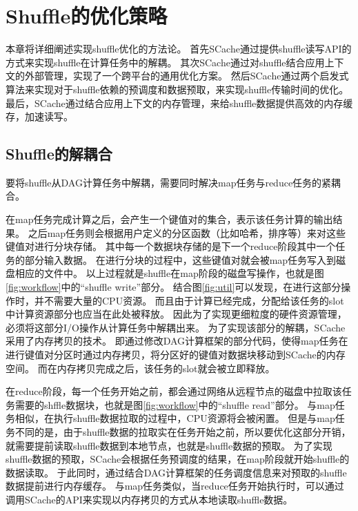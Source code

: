
\chapter{Shuffle的优化策略}
\label{chap:optimization}

本章将详细阐述实现shuffle优化的方法论。
首先SCache通过提供shuffle读写API的方式来实现shuffle在计算任务中的解耦。
其次SCache通过对shuffle结合应用上下文的外部管理，实现了一个跨平台的通用优化方案。
然后SCache通过两个启发式算法来实现对于shuffle依赖的预调度和数据预取，来实现shuffle传输时间的优化。
最后，SCache通过结合应用上下文的内存管理，来给shuffle数据提供高效的内存缓存，加速读写。

\section{Shuffle的解耦合}

要将shuffle从DAG计算任务中解耦，需要同时解决map任务与reduce任务的紧耦合。

在map任务完成计算之后，会产生一个键值对的集合，表示该任务计算的输出结果。
之后map任务则会根据用户定义的分区函数（比如哈希，排序等）来对这些键值对进行分块存储。
其中每一个数据块存储的是下一个reduce阶段其中一个任务的部分输入数据。
在进行分块的过程中，这些键值对就会被map任务写入到磁盘相应的文件中。
以上过程就是shuffle在map阶段的磁盘写操作，也就是图\ref{fig:workflow}中的“shuffle write”部分。
结合图\ref{fig:util}可以发现，在进行这部分操作时，并不需要大量的CPU资源。
而且由于计算已经完成，分配给该任务的slot中计算资源部分也应当在此处被释放。
因此为了实现更细粒度的硬件资源管理，必须将这部分I/O操作从计算任务中解耦出来。
为了实现该部分的解耦，SCache采用了内存拷贝的技术。
即通过修改DAG计算框架的部分代码，使得map任务在进行键值对分区时通过内存拷贝，将分区好的键值对数据块移动到SCache的内存空间。
而在内存拷贝完成之后，该任务的slot就会被立即释放。

在reduce阶段，每一个任务开始之前，都会通过网络从远程节点的磁盘中拉取该任务需要的shffle数据块，也就是图\ref{fig:workflow}中的“shuffle read”部分。
与map任务相似，在执行shuffle数据拉取的过程中，CPU资源将会被闲置。
但是与map任务不同的是，由于shuffle数据的拉取实在任务开始之前，所以要优化这部分开销，就需要提前读取shuffle数据到本地节点，也就是shuffle数据的预取。
为了实现shuffle数据的预取，SCache会根据任务预调度的结果，在map阶段就开始shuffle的数据读取。
于此同时，通过结合DAG计算框架的任务调度信息来对预取的shuffle数据提前进行内存缓存。
与map任务类似，当reduce任务开始执行时，可以通过调用SCache的API来实现以内存拷贝的方式从本地读取shuffle数据。

